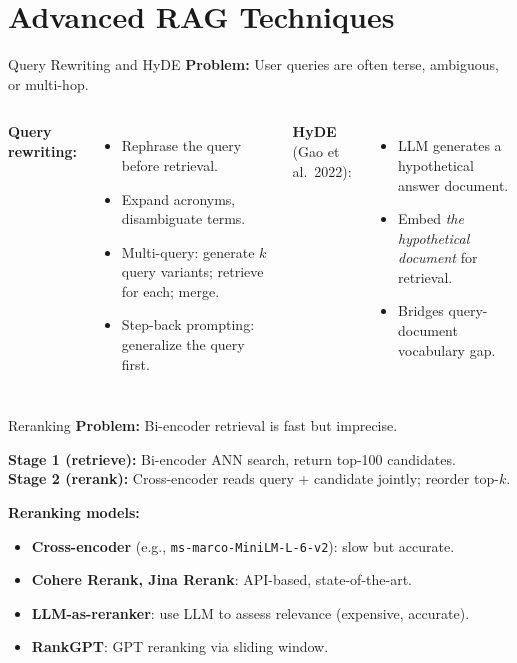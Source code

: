 \documentclass[aspectratio=169,10pt]{beamer}
\begin{document}
\section{Advanced RAG Techniques}

\begin{frame}{Query Rewriting and HyDE}
  \textbf{Problem:} User queries are often terse, ambiguous, or multi-hop.
  \vspace{0.4em}
  \begin{columns}[T]
      \textbf{Query rewriting:}
      \begin{itemize}
        \item Rephrase the query before retrieval.
        \item Expand acronyms, disambiguate terms.
        \item Multi-query: generate $k$ query variants; retrieve for each; merge.
        \item Step-back prompting: generalize the query first.
      \end{itemize}
      \vspace{0.4em}
      \textbf{HyDE} (Gao et al.\ 2022):
      \begin{itemize}
        \item LLM generates a hypothetical answer document.
        \item Embed \emph{the hypothetical document} for retrieval.
        \item Bridges query-document vocabulary gap.
      \end{itemize}
  \end{columns}
\end{frame}

\begin{frame}{Reranking}
  \textbf{Problem:} Bi-encoder retrieval is fast but imprecise.
  \vspace{0.4em}
  \begin{tcolorbox}[hitbox, title=Two-Stage Retrieval]
    \textbf{Stage 1 (retrieve):} Bi-encoder ANN search, return top-100 candidates.\\
    \textbf{Stage 2 (rerank):} Cross-encoder reads query + candidate jointly; reorder top-$k$.
  \end{tcolorbox}
  \vspace{0.4em}
  \textbf{Reranking models:}
  \begin{itemize}
    \item \textbf{Cross-encoder} (e.g., \texttt{ms-marco-MiniLM-L-6-v2}): slow but accurate.
    \item \textbf{Cohere Rerank, Jina Rerank}: API-based, state-of-the-art.
    \item \textbf{LLM-as-reranker}: use LLM to assess relevance (expensive, accurate).
    \item \textbf{RankGPT}: GPT reranking via sliding window.
  \end{itemize}
\end{frame}
\end{document}
